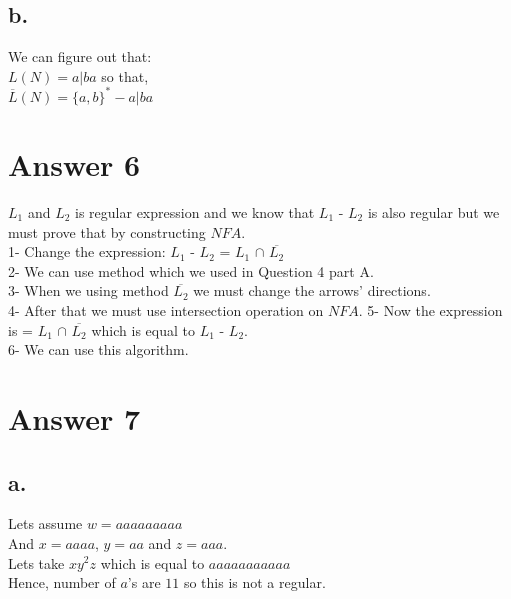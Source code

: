 \documentclass[12pt]{article}
\begin{document}
\subsection*{b.}

We can figure out that:\\ 
\(L(N) = a | ba\) so that,\\
$\overline{L}$\((N) = \{a,b\}^* - a | ba\)
\section*{Answer 6}
\(L_1\) and \(L_2\) is regular expression and we know that \(L_1\) - \(L_2\) is also regular but we must prove that by constructing \(NFA\).\\
1- Change the expression: \(L_1\) - \(L_2\)  = \(L_1\) $\cap$ $\overline{L_2}$\\
2- We can use method which we used in Question 4 part A.\\
3- When we using method $\overline{L_2}$ we must change the arrows' directions.\\
4- After that we must use intersection operation on \(NFA\).
5- Now the expression is = \(L_1\) $\cap$ $\overline{L_2}$ which is equal to \(L_1\) - \(L_2\).\\
6- We can use this algorithm.\\ 


\section*{Answer 7}

\subsection*{a.}
Lets assume \(w = aaaaaaaaa\)\\ 
And \(x = aaaa\), \(y = aa\) and \(z = aaa\).\\ 
Lets take \(xy^2z\) which is equal to \(aaaaaaaaaaa\)\\ Hence, number of \(a\)'s are \(11\) so this is not a regular.
\end{document}
